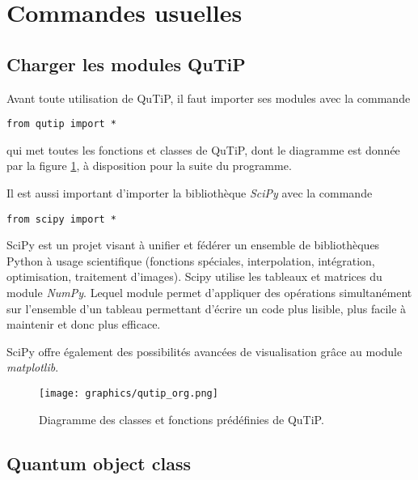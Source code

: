 \section{Commandes usuelles}

\subsection{Charger les modules QuTiP}

Avant toute utilisation de QuTiP, il faut importer ses modules avec la commande
\begin{lstlisting}
from qutip import *
\end{lstlisting}
qui met toutes les fonctions et classes de QuTiP, dont le diagramme est donnée 
par la figure \ref{fig:qutip_org}, à disposition pour la suite du programme.

Il est aussi important d'importer la bibliothèque \emph{SciPy} avec la commande
\begin{lstlisting}
from scipy import *
\end{lstlisting}
SciPy est un projet visant à unifier et fédérer un ensemble de bibliothèques 
Python à usage scientifique (fonctions spéciales, interpolation, intégration, 
optimisation, traitement d'images). Scipy utilise les tableaux et matrices du 
module \emph{NumPy}. Lequel module permet d'appliquer des opérations 
simultanément sur l'ensemble d'un tableau permettant d'écrire un code plus 
lisible, plus facile à maintenir et donc plus efficace.

SciPy offre également des possibilités avancées de visualisation grâce au 
module \emph{matplotlib}.

\begin{figure}[htbp]
 \centering
 \texttt{[image: graphics/qutip\_org.png]}
 \caption{Diagramme des classes et fonctions prédéfinies de QuTiP.}
 \label{fig:qutip_org}
\end{figure}

\subsection{Quantum object class}

